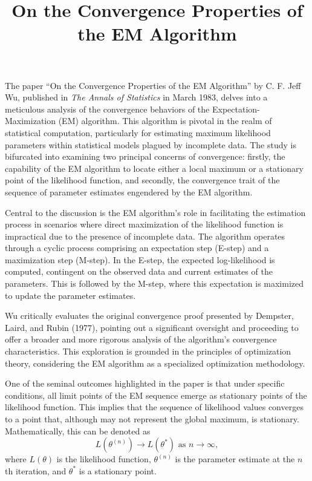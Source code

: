 \documentclass{article}
\title{On the Convergence Properties of the EM Algorithm}
\date{}
\begin{document}
\maketitle
The paper ``On the Convergence Properties of the EM Algorithm'' by C. F. Jeff Wu, published in \textit{The Annals of Statistics} in March 1983, delves into a meticulous analysis of the convergence behaviors of the Expectation-Maximization (EM) algorithm. This algorithm is pivotal in the realm of statistical computation, particularly for estimating maximum likelihood parameters within statistical models plagued by incomplete data. The study is bifurcated into examining two principal concerns of convergence: firstly, the capability of the EM algorithm to locate either a local maximum or a stationary point of the likelihood function, and secondly, the convergence trait of the sequence of parameter estimates engendered by the EM algorithm.

Central to the discussion is the EM algorithm’s role in facilitating the estimation process in scenarios where direct maximization of the likelihood function is impractical due to the presence of incomplete data. The algorithm operates through a cyclic process comprising an expectation step (E-step) and a maximization step (M-step). In the E-step, the expected log-likelihood is computed, contingent on the observed data and current estimates of the parameters. This is followed by the M-step, where this expectation is maximized to update the parameter estimates.

Wu critically evaluates the original convergence proof presented by Dempster, Laird, and Rubin (1977), pointing out a significant oversight and proceeding to offer a broader and more rigorous analysis of the algorithm's convergence characteristics. This exploration is grounded in the principles of optimization theory, considering the EM algorithm as a specialized optimization methodology.

One of the seminal outcomes highlighted in the paper is that under specific conditions, all limit points of the EM sequence emerge as stationary points of the likelihood function. This implies that the sequence of likelihood values converges to a point that, although may not represent the global maximum, is stationary. Mathematically, this can be denoted as
\[L(\theta^{(n)}) \rightarrow L(\theta^*) \text{ as } n \rightarrow \infty,\]
where \(L(\theta)\) is the likelihood function, \(\theta^{(n)}\) is the parameter estimate at the \(n\)th iteration, and \(\theta^*\) is a stationary point.
\end{document}
